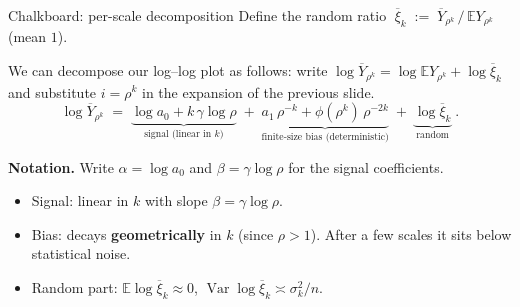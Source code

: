 \documentclass[10pt, aspectratio=169, xcolor={table}]{beamer}
\newcommand{\E}{\mathbb{E}}
\newcommand{\Var}{\operatorname{Var}}
\newcommand{\TODO}[1]{{\color{red}\textbf{[TODO]} #1}}
\renewcommand{\TODO}[1]{}
\begin{document}
\begin{frame}{Chalkboard: per-scale decomposition}
  Define the random ratio
  $\;\overline{\xi}_k \;:=\; \overline Y_{\rho^k}\,/\,\E Y_{\rho^k}\;$
  (mean $1$).

  \vspace{0.2em}
  We can decompose our log--log plot as follows: write
  $\log \overline Y_{\rho^k} = \log \E Y_{\rho^k} + \log \overline{\xi}_k$
  and substitute $i = \rho^k$ in the expansion of the previous slide.
  \[
    \boxed{\;
      \log \overline Y_{\rho^k} \;=\;
        \underbrace{\log a_0 + k\,\gamma \log \rho}_{\text{signal (linear in }k\text{)}}
        \;+\;
        \underbrace{a_1\, \rho^{-k} + \phi(\rho^k)\, \rho^{-2k}}_{\text{finite-size bias (deterministic)}}
        \;+\;
        \underbrace{\log \overline{\xi}_k}_{\text{random}}\;.\;}
  \]

  \vspace{0.2em}
  {\footnotesize\textbf{Notation.} Write $\alpha = \log a_0$ and
  $\beta = \gamma \log \rho$ for the signal coefficients.}

  \vspace{0.4em}
  \begin{itemize}
    \item Signal: linear in $k$ with slope $\beta = \gamma \log \rho$.
    \item Bias: decays \textbf{geometrically} in $k$ (since $\rho > 1$).
          After a few scales it sits below statistical noise.
    \item Random part: $\E \log \overline{\xi}_k \approx 0$,
          $\Var \log \overline{\xi}_k \asymp \sigma_k^2 / n$.
  \end{itemize}

  \TODO{Board steps:
        (1) $\log \E Y_i = \log a_0 + \gamma \log i + a_1/i + \phi(i)/i^2$
            from the expansion;
        (2) substitute $i = \rho^k$: $\log i = k \log \rho$,
            $1/i = \rho^{-k}$;
        (3) add the random offset $\log \overline{\xi}_k$ to pass from
            $\E Y$ to $\overline Y$;
        (4) box the result --- three labelled terms.}
\end{frame}
\end{document}
